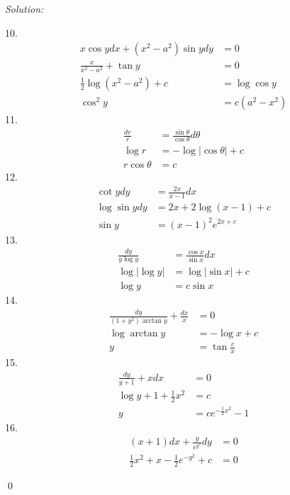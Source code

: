 \documentclass[12pt]{article}
\newenvironment{sol}
    {\emph{Solution:}
    }
    {
    \qed
    }
\begin{document}
\begin{sol}
10. 
\begin{align*}
	x\cos y dx + (x^2-a^2)\sin y dy &= 0\\
	\frac{x}{x^2-a^2} + \tan y &= 0 \\
	\frac{1}{2}\log(x^2-a^2) + c &= \log\cos y\\
	\cos^2 y &= c(a^2-x^2)
\end{align*}
11.
\begin{align*}
	\frac{dr}{r} &= \frac{\sin\theta}{\cos\theta}d\theta \\
	\log r &= -\log|\cos\theta| + c \\
	r\cos\theta &= c
\end{align*}
12. 
\begin{align*}
	\cot y dy &= \frac{2x}{x-1}dx \\
	\log\sin y dy &= 2x + 2\log(x-1) + c \\
	\sin y &= (x-1)^2e^{2x+c}
\end{align*}
13.
\begin{align*}
	\frac{dy}{y\log y} &= \frac{\cos x}{\sin x}dx \\
	\log|\log y | &= \log |\sin x| + c\\
	\log y &= c\sin x
\end{align*}
14.
\begin{align*}
	\frac{dy}{(1+y^2)\arctan y} + \frac{dx}{x} &= 0 \\
	\log\arctan y &= -\log x + c \\
	y &= \tan\frac{c}{x}
\end{align*}
15.
\begin{align*}
	\frac{dy}{y+1} + xdx &= 0 \\
	\log y+1 + \frac{1}{2}x^2 &= c \\
	y &= ce^{-\frac{1}{2}x^2}-1
\end{align*}
16.
\begin{align*}
	(x+1)dx+\frac{y}{e^{y^2}}dy &= 0\\
	\frac{1}{2}x^2 + x -\frac{1}{2}e^{-y^2}+c &= 0 
\end{align*}
\end{sol}
\end{document}
